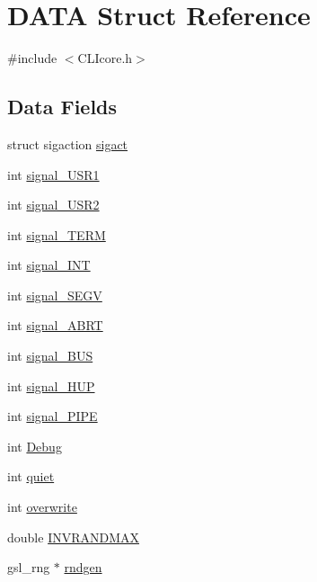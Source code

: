 \hypertarget{structDATA}{\section{D\+A\+T\+A Struct Reference}
\label{structDATA}
}


{\ttfamily \#include $<$C\+L\+Icore.\+h$>$}

\subsection*{Data Fields}
\begin{DoxyCompactItemize}
\item 
struct sigaction \hyperlink{structDATA_a24a327ad06e9f5c593d4dbd4665afab8}{sigact}
\item 
int \hyperlink{structDATA_a64bae9d671e98229a54fea43d5d4f9b5}{signal\+\_\+\+U\+S\+R1}
\item 
int \hyperlink{structDATA_a2be71623c71eb07003ff60f14240b31a}{signal\+\_\+\+U\+S\+R2}
\item 
int \hyperlink{structDATA_a700e0a489eabf7785da7361c2135f159}{signal\+\_\+\+T\+E\+R\+M}
\item 
int \hyperlink{structDATA_a2115f511041aeeab82362a9df65a0559}{signal\+\_\+\+I\+N\+T}
\item 
int \hyperlink{structDATA_aacd64e13fa75fd7ef3eec511d8e450fb}{signal\+\_\+\+S\+E\+G\+V}
\item 
int \hyperlink{structDATA_a9b81633fc9e733802e8728fb576d0dad}{signal\+\_\+\+A\+B\+R\+T}
\item 
int \hyperlink{structDATA_acf9d0a530498a0b4686669a8804ace39}{signal\+\_\+\+B\+U\+S}
\item 
int \hyperlink{structDATA_af93e1812297d27834fc3ef540bdc3c20}{signal\+\_\+\+H\+U\+P}
\item 
int \hyperlink{structDATA_a344a1577d41f11ddafcd06d1c892fc75}{signal\+\_\+\+P\+I\+P\+E}
\item 
int \hyperlink{structDATA_a8148a9459923d124f03989f0c796e137}{Debug}
\item 
int \hyperlink{structDATA_a3f7eda27560572dd2510250a1935deb5}{quiet}
\item 
int \hyperlink{structDATA_a600cb8c85d463a76ca1dfe9d0097c8f3}{overwrite}
\item 
double \hyperlink{structDATA_aa17d253cb7412ac4cbc8f034dfe78308}{I\+N\+V\+R\+A\+N\+D\+M\+A\+X}
\item 
gsl\+\_\+rng $\ast$ \hyperlink{structDATA_a819c0e911d771dbb7da0dbf26e993fc2}{rndgen}
\item 

\end{DoxyCompactItemize}
